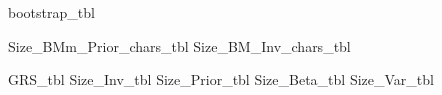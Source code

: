 



\begin{landscape}
{bootstrap_tbl}
\end{landscape}

{Size_BMm_Prior_chars_tbl}
{Size_BM_Inv_chars_tbl}

{GRS_tbl}
{Size_Inv_tbl}
{Size_Prior_tbl}
{Size_Beta_tbl}
{Size_Var_tbl}
